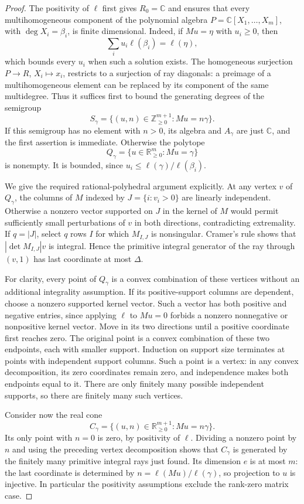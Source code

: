 \documentclass[11pt,a4paper]{article}
\begin{document}
\begin{proof}
The positivity of $\ell$ first gives $R_0=\mathbb C$ and ensures that
every multihomogeneous component of the polynomial algebra
$P=\mathbb C[X_1,\ldots,X_m]$, with $\deg X_i=\beta_i$, is finite
dimensional. Indeed, if $M u=\eta$ with $u_i\ge0$, then
\[
 \sum_i u_i\ell(\beta_i)=\ell(\eta),
\]
which bounds every $u_i$ when such a solution exists. The homogeneous
surjection $P\longrightarrow R$, $X_i\mapsto x_i$, restricts to a
surjection of ray diagonals: a preimage of a multihomogeneous element
can be replaced by its component of the same multidegree. Thus it
suffices first to bound the generating degrees of the semigroup
\[
 S_\gamma=\{(u,n)\in\mathbb Z_{\ge0}^{m+1}:Mu=n\gamma\}.
 \tag{P-F16d}
\]
If this semigroup has no element with $n>0$, its algebra and $A_\gamma$
are just $\mathbb C$, and the first assertion is immediate. Otherwise
the polytope
\[
 Q_\gamma=\{u\in\mathbb R_{\ge0}^m:Mu=\gamma\}
\]
is nonempty. It is bounded, since
$u_i\le\ell(\gamma)/\ell(\beta_i)$.

We give the required rational-polyhedral argument explicitly.
At any vertex $v$ of $Q_\gamma$, the columns of $M$ indexed by
$J=\{i:v_i>0\}$ are linearly independent. Otherwise a nonzero
vector supported on $J$ in the kernel of $M$ would permit sufficiently
small perturbations of $v$ in both directions, contradicting extremality.
If $q=|J|$, select $q$ rows $I$ for which $M_{I,J}$ is nonsingular.
Cramer's rule shows that $|\det M_{I,J}|v$ is integral. Hence the
primitive integral generator of the ray through $(v,1)$ has last
coordinate at most $\Delta$.

For clarity, every point of $Q_\gamma$ is a convex combination of
these vertices without an additional integrality assumption. If its
positive-support columns are dependent, choose a nonzero supported
kernel vector. Such a vector has both positive and negative entries,
since applying $\ell$ to $M u=0$ forbids a nonzero nonnegative or
nonpositive kernel vector. Move in its two directions until a positive
coordinate first reaches zero. The original point is a convex
combination of these two endpoints, each with smaller support.
Induction on support size terminates at points with independent
support columns. Such a point is a vertex: in any convex decomposition,
its zero coordinates remain zero, and independence makes both endpoints
equal to it. There are only finitely many possible independent supports,
so there are finitely many such vertices.

Consider now the real cone
\[
 C_\gamma=\{(u,n)\in\mathbb R_{\ge0}^{m+1}:Mu=n\gamma\}.
\]
Its only point with $n=0$ is zero, by positivity of $\ell$.
Dividing a nonzero point by $n$ and using the preceding vertex
decomposition shows that $C_\gamma$ is generated by the finitely many
primitive integral rays just found. Its dimension $e$ is at most $m$:
the last coordinate is determined by
$n=\ell(Mu)/\ell(\gamma)$, so projection to $u$ is injective.
In particular the positivity assumptions exclude the rank-zero matrix
case.


\end{proof}
\end{document}
